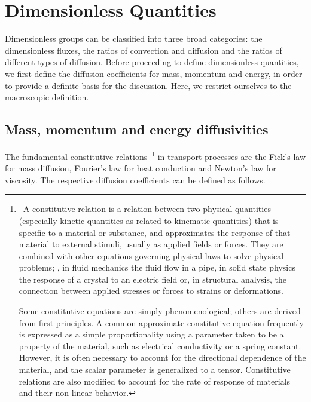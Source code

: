 \section{Dimensionless Quantities}
Dimensionless groups can be classified into three broad categories: the dimensionless fluxes, the ratios of convection and diffusion and the ratios of different types of diffusion. Before proceeding to define dimensionless quantities, we first define the diffusion coefficients for mass, momentum and energy, in order to provide a definite basis for the discussion. Here, we restrict ourselves to the macroscopic definition.


\subsection{Mass, momentum and energy diffusivities}
The fundamental constitutive relations~\footnote{~A constitutive relation is a relation between two physical quantities (especially kinetic quantities as related to kinematic quantities) that is specific to a material or substance, and approximates the response of that material to external stimuli, usually as applied fields or forces. They are combined with other equations governing physical laws to solve physical problems; \eg, in fluid mechanics the fluid flow in a pipe, in solid state physics the response of a crystal to an electric field or, in structural analysis, the connection between applied stresses or forces to strains or deformations. 

Some constitutive equations are simply phenomenological; others are derived from first principles. A common approximate constitutive equation frequently is expressed as a simple proportionality using a parameter taken to be a property of the material, such as electrical conductivity or a spring constant. However, it is often necessary to account for the directional dependence of the material, and the scalar parameter is generalized to a tensor. Constitutive relations are also modified to account for the rate of response of materials and their non-linear behavior.} in transport processes are the Fick's law for mass diffusion, Fourier's law for heat conduction and Newton's law for viscosity. The respective diffusion coefficients can be defined as follows.
%
